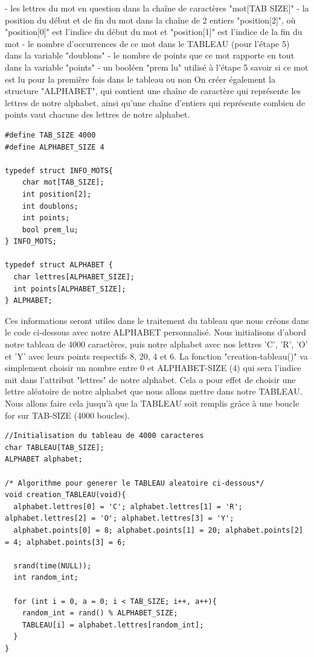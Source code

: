 \documentclass{article}
\begin{document}
    - les lettres du mot en question dans la chaîne de caractères "mot[TAB SIZE]"\newline
    - la position du début et de fin du mot dans la chaîne de 2 entiers "position[2]", où "position[0]" est l'indice du début du mot et "position[1]" est l'indice de la fin du mot\newline
    - le nombre d'occurrences de ce mot dans le TABLEAU (pour l'étape 5) dans la variable "doublons"\newline
    - le nombre de points que ce mot rapporte en tout dans la variable "points" \newline
    - un booléen "prem lu" utilisé à l'étape 5 savoir si ce mot est lu pour la première fois dans le tableau ou non\newline\newline
On créer également la structure "ALPHABET", qui contient une chaîne de caractère qui représente les lettres de notre alphabet, ainsi qu'une chaîne d'entiers qui représente combien de points vaut chacune des lettres de notre alphabet.\newline
\begin{lstlisting}[style=Cstyle]
#define TAB_SIZE 4000
#define ALPHABET_SIZE 4

typedef struct INFO_MOTS{
    char mot[TAB_SIZE];
    int position[2];
    int doublons;
    int points;
    bool prem_lu;
} INFO_MOTS;

typedef struct ALPHABET {
  char lettres[ALPHABET_SIZE];
  int points[ALPHABET_SIZE];
} ALPHABET;
\end{lstlisting}
Ces informations seront utiles dans le traitement du tableau que nous créons dans le code ci-dessous avec notre ALPHABET personnalisé. Nous initialisons d'abord notre tableau de 4000 caractères, puis notre alphabet avec nos lettres 'C', 'R', 'O' et 'Y' avec leurs points respectifs 8, 20, 4 et 6. La fonction "creation-tableau()" va simplement choisir un nombre entre 0 et ALPHABET-SIZE (4) qui sera l'indice mit dans l'attribut "lettres" de notre alphabet. Cela a pour effet de choisir une lettre aléatoire de notre alphabet que nous allons mettre dans notre TABLEAU. Nous allons faire cela jusqu'à que la TABLEAU soit remplis grâce à une boucle for sur TAB-SIZE (4000 boucles).\newline

\begin{lstlisting}[style=Cstyle]
//Initialisation du tableau de 4000 caracteres
char TABLEAU[TAB_SIZE];
ALPHABET alphabet;

/* Algorithme pour generer le TABLEAU aleatoire ci-dessous*/
void creation_TABLEAU(void){
  alphabet.lettres[0] = 'C'; alphabet.lettres[1] = 'R'; alphabet.lettres[2] = 'O'; alphabet.lettres[3] = 'Y';
  alphabet.points[0] = 8; alphabet.points[1] = 20; alphabet.points[2] = 4; alphabet.points[3] = 6;

  srand(time(NULL));
  int random_int;

  for (int i = 0, a = 0; i < TAB_SIZE; i++, a++){
    random_int = rand() % ALPHABET_SIZE;
    TABLEAU[i] = alphabet.lettres[random_int];
  }
}
\end{lstlisting}
\end{document}
